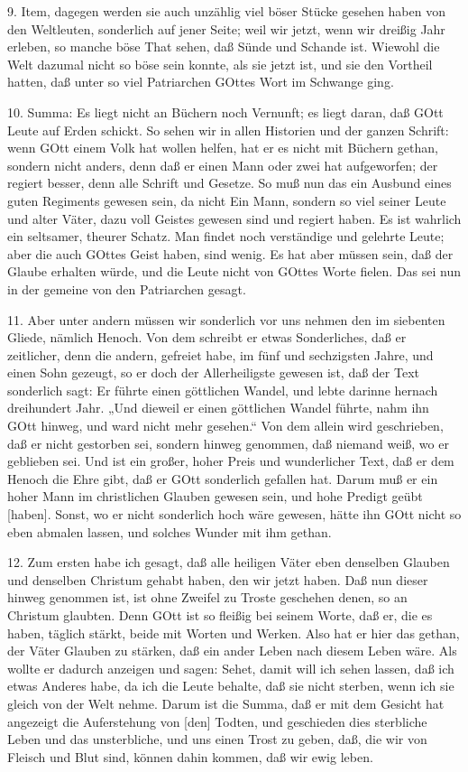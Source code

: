 9. Item, dagegen werden sie auch unzählig viel böser Stücke gesehen haben von den Weltleuten, sonderlich auf jener Seite; weil wir jetzt, wenn wir dreißig Jahr erleben, so manche böse That sehen, daß Sünde und Schande ist. Wiewohl die Welt dazumal nicht so böse sein konnte, als sie jetzt ist, und sie den Vortheil hatten, daß unter so viel Patriarchen GOttes Wort im Schwange ging.

10. Summa: Es liegt nicht an Büchern noch Vernunft; es liegt daran, daß GOtt Leute auf Erden schickt. So sehen wir in allen Historien und der ganzen Schrift: wenn GOtt einem Volk hat wollen helfen, hat er es nicht mit Büchern gethan, sondern nicht anders, denn daß er einen Mann oder zwei hat aufgeworfen; der regiert besser, denn alle Schrift und Gesetze. So muß nun das ein Ausbund eines guten Regiments gewesen sein, da nicht Ein Mann, sondern so viel seiner Leute und alter Väter, dazu voll Geistes gewesen sind und regiert haben. Es ist wahrlich ein seltsamer, theurer Schatz. Man findet noch verständige und gelehrte Leute; aber die auch GOttes Geist haben, sind wenig. Es hat aber müssen sein, daß der Glaube erhalten würde, und die Leute nicht von GOttes Worte fielen. Das sei nun in der gemeine von den Patriarchen gesagt.

11. Aber unter andern müssen wir sonderlich vor uns nehmen den im siebenten Gliede, nämlich Henoch. Von dem schreibt er etwas Sonderliches, daß er zeitlicher, denn die andern, gefreiet habe, im fünf und sechzigsten Jahre, und einen Sohn gezeugt, so er doch der Allerheiligste gewesen ist, daß der Text sonderlich sagt: Er führte einen göttlichen Wandel, und lebte darinne hernach dreihundert Jahr. „Und dieweil er einen göttlichen Wandel führte, nahm ihn GOtt hinweg, und ward nicht mehr gesehen.“ Von dem allein wird geschrieben, daß er nicht gestorben sei, sondern hinweg genommen, daß niemand weiß, wo er geblieben sei. Und ist ein großer, hoher Preis und wunderlicher Text, daß er dem Henoch die Ehre gibt, daß er GOtt sonderlich gefallen hat. Darum muß er ein hoher Mann im christlichen Glauben gewesen sein, und hohe Predigt geübt [haben]. Sonst, wo er nicht sonderlich hoch wäre gewesen, hätte ihn GOtt nicht so eben abmalen lassen, und solches Wunder mit ihm gethan.

12. Zum ersten habe ich gesagt, daß alle heiligen Väter eben denselben Glauben und denselben Christum gehabt haben, den wir jetzt haben. Daß nun dieser hinweg genommen ist, ist ohne Zweifel zu Troste geschehen denen, so an Christum glaubten. Denn GOtt ist so fleißig bei seinem Worte, daß er, die es haben, täglich stärkt, beide mit Worten und Werken. Also hat er hier das gethan, der Väter Glauben zu stärken, daß ein ander Leben nach diesem Leben wäre. Als wollte er dadurch anzeigen und sagen: Sehet, damit will ich sehen lassen, daß ich etwas Anderes habe, da ich die Leute behalte, daß sie nicht sterben, wenn ich sie gleich von der Welt nehme. Darum ist die Summa, daß er mit dem Gesicht hat angezeigt die Auferstehung von [den] Todten, und geschieden dies sterbliche Leben und das unsterbliche, und uns einen Trost zu geben, daß, die wir von Fleisch und Blut sind, können dahin kommen, daß wir ewig leben.

